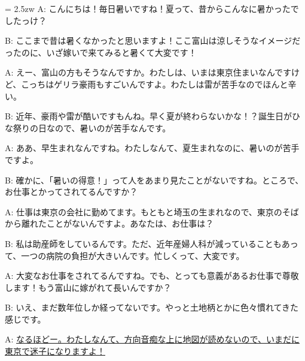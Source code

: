 \documentclass[11pt]{amsart}
\title{}
\author{}
\newenvironment{hangall}[1]{\hangindent = 2.5zw\everypar{\hangindent = 2.5zw}}{}
\begin{document}
\maketitle
\begin{hangall}{}%
A: こんにちは！毎日暑いですね！夏って、昔からこんなに暑かったでしたっけ？

B: ここまで昔は暑くなかったと思いますよ！ここ富山は涼しそうなイメージだったのに、いざ嫁いで来てみると暑くて大変です！

A: えー、富山の方もそうなんですか。わたしは、いまは東京住まいなんですけど、こっちはゲリラ豪雨もすごいんですよ。わたしは雷が苦手なのでほんと辛い。

B: 近年、豪雨や雷が酷いですもんね。早く夏が終わらないかな！？誕生日がひな祭りの日なので、暑いのが苦手なんです。

A: ああ、早生まれなんですね。わたしなんて、夏生まれなのに、暑いのが苦手ですよ。

B: 確かに、「暑いの得意！」って人をあまり見たことがないですね。ところで、お仕事とかってされてるんですか？

A: 仕事は東京の会社に勤めてます。もともと埼玉の生まれなので、東京のそばから離れたことがないんですよ。あなたは、お仕事は？

B: 私は助産師をしているんです。ただ、近年産婦人科が減っていることもあって、一つの病院の負担が大きいんです。忙しくって、大変です。

A: 大変なお仕事をされてるんですね。でも、とっても意義があるお仕事で尊敬します！もう富山に嫁がれて長いんですか？

B: いえ、まだ数年位しか経ってないです。やっと土地柄とかに色々慣れてきた感じです。

A: \ul{なるほどー。わたしなんて、方向音痴な上に地図が読めないので、いまだに東京で迷子になりますよ！}\end{hangall}
\end{document}
